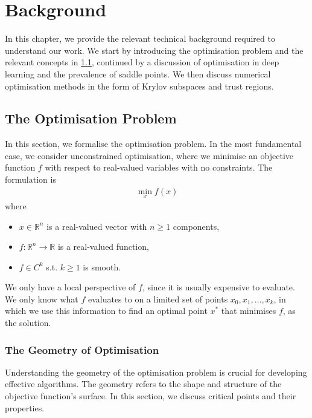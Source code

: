 \chapter{Background}
\label{chap:background}

In this chapter, we provide the relevant technical background required to understand our work. We start by introducing the optimisation problem and the relevant concepts in \cref{sec:optimisation_problem}, continued by a discussion of optimisation in deep learning and the prevalence of saddle points. We then discuss numerical optimisation methods in the form of Krylov subspaces and trust regions.

\section{The Optimisation Problem}
\label{sec:optimisation_problem}

In this section, we formalise the optimisation problem. In the most fundamental case, we consider unconstrained optimisation, where we minimise an objective function $f$ with respect to real-valued variables with no constraints. The formulation is 
\begin{align}
    \min_{x} f(x)
\end{align}
where
\begin{itemize}
    \item $x \in \mathbb{R}^n$ is a real-valued vector with $n \geq 1$ components,
    \item $f: \mathbb{R}^n \to \mathbb{R}$ is a real-valued function,
    \item $f \in C^k$ s.t. $k \geq 1$ is smooth.
\end{itemize}
We only have a local perspective of $f$, since it is usually expensive to evaluate. We only know what $f$ evaluates to on a limited set of points $x_0, x_1, \ldots, x_k$, in which we use this information to find an optimal point $x^*$ that minimises $f$, as the solution. 

\subsection{The Geometry of Optimisation}
\label{sec:geometry_of_optimisation}



Understanding the geometry of the optimisation problem is crucial for developing effective algorithms. The geometry refers to the shape and structure of the objective function's surface. In this section, we discuss critical points and their properties.

